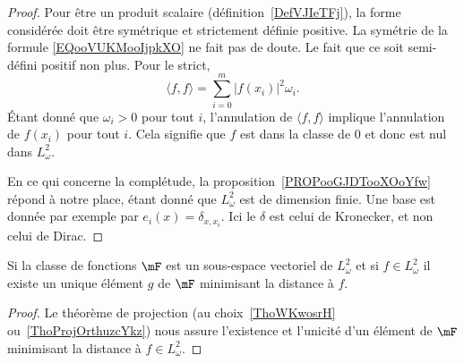 \begin{proof}
	Pour être un produit scalaire (définition~\ref{DefVJIeTFj}), la forme considérée doit être symétrique et strictement définie positive. La symétrie de la formule \eqref{EQooVUKMooIjpkXO} ne fait pas de doute. Le fait que ce soit semi-défini positif non plus. Pour le strict,
	\begin{equation}
		\langle f, f\rangle =\sum_{i=0}^m| f(x_i) |^2\omega_i.
	\end{equation}
	Étant donné que \( \omega_i>0\) pour tout \( i\), l'annulation de \( \langle f, f\rangle \) implique l'annulation de \( f(x_i)\) pour tout \( i\). Cela signifie que \( f\) est dans la classe de \( 0\) et donc est nul dans \( L^2_{\omega}\).

	En ce qui concerne la complétude, la proposition~\ref{PROPooGJDTooXOoYfw} répond à notre place, étant donné que \( L^2_{\omega}\) est de dimension finie. Une base est donnée par exemple par \( e_i(x)=\delta_{x,x_{i}}\). Ici le \( \delta\) est celui de Kronecker, et non celui de Dirac.
\end{proof}

\begin{lemma}
	Si la classe de fonctions \( \mF\) est un sous-espace vectoriel de \( L^2_{\omega}\) et si \( f\in L^2_{\omega}\) il existe un unique élément \( g\) de \( \mF\) minimisant la distance à \( f\).
\end{lemma}

\begin{proof}
	Le théorème de projection (au choix~\ref{ThoWKwosrH} ou~\ref{ThoProjOrthuzcYkz}) nous assure l'existence et l'unicité d'un élément de \( \mF\) minimisant la distance à \( f\in L^2_{\omega}\).
\end{proof}

